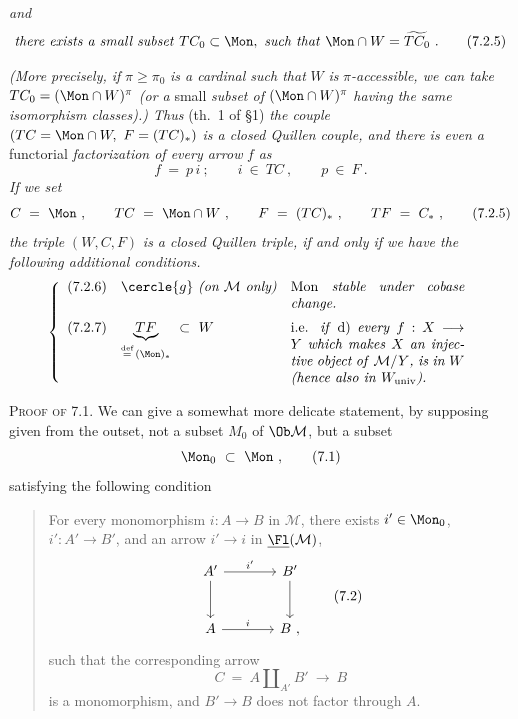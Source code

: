 
\textit{and}
\[
\text{\textit{there exists a small subset} } TC_0 \subset \Mon, \text{ \textit{such that} } \Mon \cap W = \widetilde{TC_0}\ . \tag*{(7.2.5)} %
\]

\textit{(More precisely, if} $\pi \geq \pi_0$ \textit{is a cardinal such that} $W$ \textit{is} $\pi$\textit{-accessible, we can take} $TC_0 = (\Mon \cap W)^{\pi}$ \textit{(or a} small \textit{subset of} $(\Mon \cap W)^{\pi}$ \textit{having the same isomorphism classes).) Thus} (th.~1 of §1) \textit{the couple} $(TC = \Mon \cap W,\ F = (TC)_*)$ \textit{is a closed Quillen couple, and there is even a} functorial \textit{factorization of every arrow} $f$ \textit{as}
\[
f \ = \ p\, i \ ; \qquad i \ \in \ TC \ , \qquad p \ \in \ F \ . \tag*{(7.2.4)}
\]
\textit{If we set}
\[
C \ = \ \Mon \ , \qquad TC \ = \ \Mon \cap W \ , \qquad F \ = \ (TC)_* \ , \qquad TF \ = \ C_* \ , \tag*{(7.2.5)}
\]
\textit{the triple} $(W, C, F)$ \textit{is a closed Quillen triple, if and only if we have the following additional conditions.}
\[
\left\{
\begin{array}{lll}
\text{(7.2.6)} & \cercle{g}\ \text{\textit{(on $\mathcal{M}$ only)}} & \parbox[t]{0.36\textwidth}{Mon \textit{stable under cobase change.}} \\[4ex]
\text{(7.2.7)} & \underbrace{TF}_{\overset{\text{def}}{=}\,(\Mon)_*} \ \subset \ W & \parbox[t]{0.36\textwidth}{i.e. \textit{if} d) \textit{every} $f : X \longrightarrow Y$ \textit{which makes} $X$ \textit{an injective object of} $\mathcal{M}/Y$\textit{, is in} $W$ \textit{(hence also in} $W_{\mathrm{univ}}$\textit{).}}
\end{array}
\right.
\]


\textsc{Proof of} 7.1. We can give a somewhat more delicate statement, by supposing given from the outset, not a subset $M_0$ of $\Ob \mathcal{M}$, but a subset
\[
\Mon_0 \ \subset \ \Mon \ , \tag*{(7.1)}
\]
satisfying the following condition

\begin{quote}
For every monomorphism $i : A \longrightarrow B$ in $\mathcal{M}$, there exists $i' \in \Mon_0$, $i' : A' \longrightarrow B'$, and an arrow $i' \longrightarrow i$ in $\underline{\Fl}(\mathcal{M})$,
\[
\begin{tikzcd}[row sep=large, column sep=large]
A' \arrow[r, "{i'}"] \arrow[d] & B' \arrow[d] \\
A \arrow[r, "i"] & B \ ,
\end{tikzcd}
\tag*{(7.2)}
\]
such that the corresponding arrow
\[
C \ = \ A \amalg_{A'} B' \ \longrightarrow \ B
\]
is a monomorphism, and $B' \longrightarrow B$ does not factor through $A$.
\end{quote}

